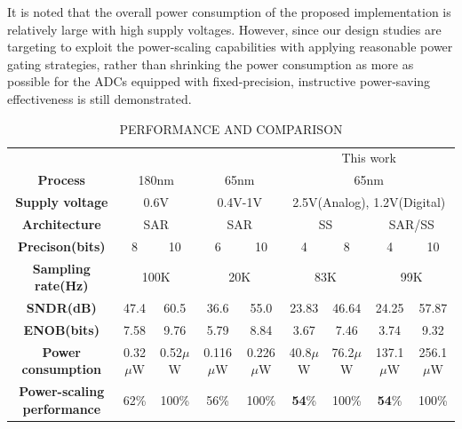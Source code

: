 It is noted that the overall power consumption of the proposed implementation is relatively large with high supply voltages. However, since our design studies are targeting to exploit the power-scaling capabilities with applying reasonable power gating strategies, rather than shrinking the power consumption as more as possible for the ADCs equipped with fixed-precision, instructive power-saving effectiveness is still demonstrated.

\begin{table}[htbp]
	\caption{PERFORMANCE AND COMPARISON}
	\begin{center}
		\begin{tabular}{|c|c|c|c|c|c|c|c|c|}
			\hline
			\textbf{}& \multicolumn{2}{|c|}{\cite{zhu_6--10-bit_2015}} & \multicolumn{2}{|c|}{\cite{yip_resolution-reconfigurable_2013}} & \multicolumn{4}{|c|}{This work} \\
			\hhline{|=========|}
			\textbf{Process}& \multicolumn{2}{|c|}{180nm} & \multicolumn{2}{|c|}{65nm} & \multicolumn{4}{|c|}{65nm} \\
			\hline 
			\textbf{Supply voltage}& \multicolumn{2}{|c|}{0.6V} & \multicolumn{2}{|c|}{0.4V-1V} & \multicolumn{4}{|c|}{2.5V(Analog), 1.2V(Digital)} \\
			\hline
			
			\textbf{Architecture}& \multicolumn{2}{|c|}{SAR} & \multicolumn{2}{|c|}{SAR} & \multicolumn{2}{|c|}{SS} & \multicolumn{2}{|c|}{SAR/SS}\\
			\hline
			\textbf{Precison(bits)} & 8 & 10 & 6 & 10 & 4 & 8 & 4 & 10 \\
			\hline
			\textbf{Sampling rate(Hz)}& \multicolumn{2}{|c|}{100K} & \multicolumn{2}{|c|}{20K} & \multicolumn{2}{|c|}{83K} & \multicolumn{2}{|c|}{99K} \\
			\hline
			\textbf{SNDR(dB)} & 47.4 & 60.5 & 36.6 & 55.0 & 23.83 & 46.64 & 24.25 & 57.87 \\
			\hline
			\textbf{ENOB(bits)}& 7.58 & 9.76 & 5.79 & 8.84 & 3.67 & 7.46 & 3.74 & 9.32 \\
			\hline
			\textbf{Power consumption}& 0.32$\mu$W & 0.52$\mu$W &  0.116$\mu$W & 0.226$\mu$W & 40.8$\mu$W & 76.2$\mu$W & 137.1$\mu$W & 256.1$\mu$W\\
			\hline
			\textbf{Power-scaling performance}& 62\% & 100\% & 56\% & 100\% & \textbf{54}\% & 100\% & \textbf{54}\% & 100\% \\
			\hline
		\end{tabular}
		\label{tab1}
	\end{center}
\end{table}
